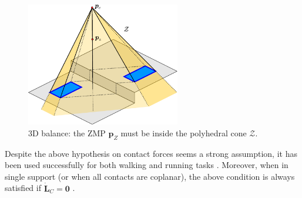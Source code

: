 \begin{figure}
    \centering
    \includegraphics[width=0.6\textwidth]{figures/balance3d.pdf}
    \caption{3D balance: the ZMP $\bm{p}_Z$ must be inside the polyhedral cone $\mathcal{Z}$.}
    \label{fig:balance3D}
\end{figure}

Despite the above hypothesis on contact forces seems a strong assumption, it
has been used successfully for both walking and running tasks
\cite{Sugihara2002ICRA,Zamparelli2018SYROCO,Sugihara2021ICRA,Smaldone2022Running}. Moreover, when in
single support (or when all contacts are coplanar), the above condition is
always satisfied if $\dot{\bm{L}}_C=\bm{0}$
\cite{Caron2017DynamicWalkingOverRoughTerrains}.